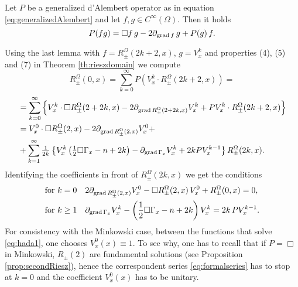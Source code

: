 \begin{lem}
	Let $P$ be a generalized d'Alembert operator as in equation \eqref{eq:generalizedAlembert} and let $f,g\in C^\infty(\Omega)$. Then it holds
	\[	P(fg)=\Box f\, g-2\partial_{\operatorname{grad} f}\,g+P(g)\, f.			\]
\end{lem}
Using the last lemma with $f=R_\pm^\Omega(2k+2,x)$, $g=V_x^k$ and properties (4), (5) and (7) in
Theorem \ref{th:rieszdomain} we compute
\[R_\pm^\Omega(0,x)=\sum_{k=0}^{\infty} P\left(V_x^k\cdot R_\pm^\Omega(2k+2,x)\right)=\]
\[	\begin{aligned}
&=\sum_{k=0}^{\infty} \left\{V_x^k\cdot \Box R_\pm^\Omega(2+2k,x)-2\partial_{\operatorname{grad} R_\pm^\Omega(2+2k,x)}V_x^k
+PV_x^k\cdot R_\pm^\Omega(2k+2,x)  \right\}\\
&=V_x^0\cdot \Box R_\pm^\Omega(2,x)-2\partial_{\operatorname{grad} R_\pm^\Omega(2,x)}V_x^0+\\
&+\sum_{k=1}^{\infty} \tfrac1{2k}\left\{V_x^k\left(\tfrac12\Box\Gamma_x-n+2k\right)-\partial_{\operatorname{grad} \Gamma_x}V_x^k+2kPV_x^{k-1}  \right\}R_\pm^\Omega(2k,x).\\
\end{aligned}		\]
Identifying the coefficients in front of $R_\pm^\Omega(2k,x)$ we get the conditions
\begin{subequations}
\begin{align}
	\text{for }&k=0\quad 2\partial_{\operatorname{grad} R_\pm^\Omega(2,x)}V_x^0-\Box R_\pm^\Omega(2,x)\,V_x^0+R_\pm^\Omega(0,x)=0,	\label{eq:hada1}\\
	\text{for } &k\geq 1\quad \partial_{\operatorname{grad}\Gamma_x}V_x^k-\left(\frac12\Box\Gamma_x-n+2k \right)V_x^k=2k\,PV_x^{k-1}.	\label{eq:hada2}
\end{align}
\end{subequations}
For consistency with the Minkowski case, between the functions that solve \eqref{eq:hada1}, one chooses $V_x^0(x)\equiv1$. To see why, one has to recall that if  $P=\Box$ in Minkowski, $R_\pm(2)$ are fundamental solutions (see Proposition \ref{prop:secondRiesz}), hence the correspondent series \eqref{eq:formalseries} has to stop at $k=0$ and the coefficient $V_x^0(x)$ has to be unitary. 



